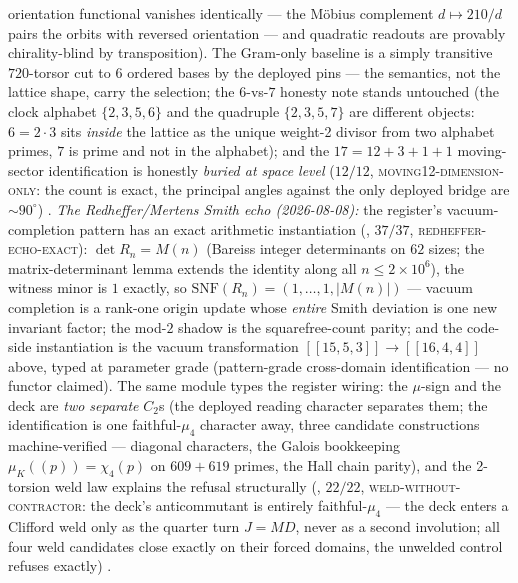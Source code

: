 \documentclass[11pt,a4paper]{article}
\theoremstyle{definition}
\begin{document}
\begin{keybox}
orientation functional vanishes identically --- the M\"obius
complement $d \mapsto 210/d$ pairs the orbits with reversed
orientation --- and quadratic readouts are provably
chirality-blind by transposition).  The Gram-only baseline is a
simply transitive $720$-torsor cut to $6$ ordered bases by the
deployed pins --- the semantics, not the lattice shape, carry the
selection; the $6$-vs-$7$ honesty note stands untouched (the
clock alphabet $\{2,3,5,6\}$ and the quadruple $\{2,3,5,7\}$ are
different objects: $6 = 2\cdot3$ sits \emph{inside} the lattice
as the unique weight-2 divisor from two alphabet primes, $7$ is
prime and not in the alphabet); and the $17 = 12{+}3{+}1{+}1$
moving-sector identification is honestly \emph{buried at space
level} ($12/12$, \textsc{moving12-dimension-only}: the count is
exact, the principal angles against the only deployed bridge are
${\sim}90^\circ$) \mE.
\emph{The Redheffer/Mertens Smith echo (2026-08-08):} the
register's vacuum-completion pattern has an exact arithmetic
instantiation (, $37/37$,
\textsc{redheffer-echo-exact}): $\det R_n = M(n)$ (Bareiss
integer determinants on $62$ sizes; the matrix-determinant lemma
extends the identity along all $n \le 2\times10^6$), the witness
minor is $1$ exactly, so $\mathrm{SNF}(R_n) = (1, \dots, 1,
|M(n)|)$ --- vacuum completion is a rank-one origin update whose
\emph{entire} Smith deviation is one new invariant factor; the
mod-$2$ shadow is the squarefree-count parity; and the code-side
instantiation is the vacuum transformation $[[15,5,3]] \to
[[16,4,4]]$ above, typed at parameter grade (pattern-grade
cross-domain identification --- no functor claimed).  The same
module types the register wiring: the $\mu$-sign and the deck
are \emph{two separate} $C_2$s (the deployed reading character
separates them; the identification is one faithful-$\mu_4$
character away, three candidate constructions machine-verified
--- diagonal characters, the Galois bookkeeping $\mu_K((p)) =
\chi_4(p)$ on $609 + 619$ primes, the Hall chain parity), and
the 2-torsion weld law explains the refusal structurally
(, $22/22$,
\textsc{weld-without-contractor}: the deck's anticommutant is
entirely faithful-$\mu_4$ --- the deck enters a Clifford weld
only as the quarter turn $J = MD$, never as a second involution;
all four weld candidates close exactly on their forced domains,
the unwelded control refuses exactly) \mE.
\end{keybox}
\end{document}
